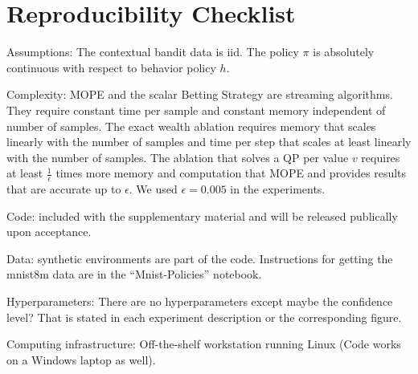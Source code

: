 \section{Reproducibility Checklist}
\begin{description}
\item Assumptions: The contextual bandit data is iid. 
The policy $\pi$ is absolutely 
continuous with respect to behavior policy $h$.
\item Complexity: MOPE and the scalar Betting Strategy are streaming algorithms. They require constant time per sample and constant memory
independent of number of samples. The exact wealth ablation requires
memory that scales linearly with the number of samples and time 
per step that scales at least linearly with the number of samples.
The ablation that solves a QP per value $v$ requires at least $\frac{1}{\epsilon}$ 
times more memory and computation that MOPE and provides 
results that are accurate up to $\epsilon$. We used 
$\epsilon=0.005$ in the experiments.
\item Code: included with the supplementary material and 
will be released publically upon acceptance.
\item Data: synthetic environments are part of the code.
Instructions for getting the mnist8m data are in the 
``Mnist-Policies'' notebook.
\item Hyperparameters: There are no hyperparameters except
maybe the confidence level? That is stated in each experiment
description or the corresponding figure.
\item Computing infrastructure: Off-the-shelf workstation running Linux
(Code works on a Windows laptop as well).
\end{description}
 
